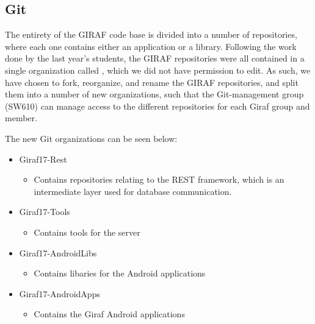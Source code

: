 \subsection{Git}\label{GitTool}
The entirety of the GIRAF code base is divided into a number of repositories,
where each one contains either an application or a library. Following the work
done by the last year's students, the GIRAF repositories  were all contained in
a single organization called , which we did not have permission to
edit. As such, we have chosen to fork, reorganize, and rename the GIRAF
repositories, and split them into a number of new organizations, such that the
Git-management group (SW610) can manage access to the different repositories
for each Giraf group and member.



The new Git organizations can be seen below:
\begin{itemize}
	\item Giraf17-Rest
	\begin{itemize}
  		\item Contains repositories relating to the REST framework, which is an
  		intermediate layer used for database communication.
	\end{itemize}
  	\item Giraf17-Tools
  	\begin{itemize}
  		\item Contains tools for the server
	\end{itemize}
  	\item Giraf17-AndroidLibs
  	\begin{itemize}
  		\item Contains libaries for the Android applications
	\end{itemize}
  	\item Giraf17-AndroidApps
  	\begin{itemize}
  		\item Contains the Giraf Android applications 
	\end{itemize}
\end{itemize}